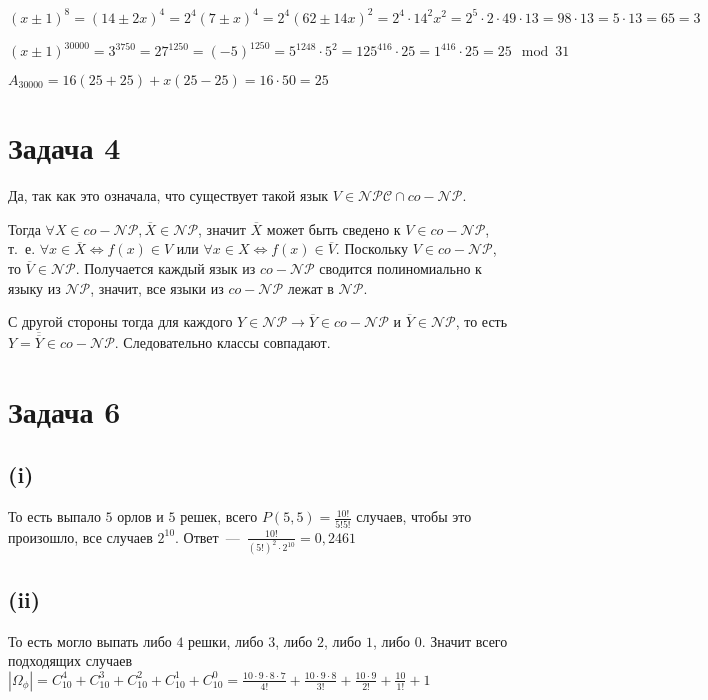 \documentclass[a4paper,12pt]{article} %
\begin{document}
$(x\pm1)^{8}=(14\pm2x)^4=2^4(7\pm x)^4=2^4(62\pm14x)^2=2^4\cdot 14^2 x^2=2^5\cdot 2\cdot 49\cdot 13=98\cdot 13=5\cdot 13=65=3$

$(x\pm1)^{30000}=3^{3750}=27^{1250}=(-5)^{1250}=5^{1248}\cdot 5^2=125^{416}\cdot 25=1^{416}\cdot 25=25\mod 31$

$A_{30000}=16(25+25)+x(25-25)=16\cdot 50=25$


\section{Задача 4}
\hspace{5mm}
Да, так как это означала, что существует такой язык $V\in\mathcal{NPC}\cap co-\mathcal{NP}$. 

Тогда $\forall X\in co-\mathcal{NP}, \overline{X}\in \mathcal{NP}$, значит $\overline{X}$ может быть сведено к $V\in co-\mathcal{NP}$, т.~е. $\forall x\in \overline{X}\Leftrightarrow f(x)\in V$ или $\forall x\in X\Leftrightarrow f(x)\in \overline{V}$. Поскольку $V\in co-\mathcal{NP}$, то $\overline{V}\in \mathcal{NP}$. Получается каждый язык из $co-\mathcal{NP}$ сводится полиномиально к языку из $\mathcal{NP}$, значит, все языки из $co-\mathcal{NP}$ лежат в $\mathcal{NP}$.

С другой стороны тогда для каждого $Y\in \mathcal{NP}\rightarrow\overline{Y}\in co-\mathcal{NP}$ и $\overline{Y}\in \mathcal{NP}$, то есть $Y=\overline{\overline{Y}}\in co-\mathcal{NP}$. Следовательно классы совпадают.


\section{Задача 6}
\subsection{(i)}
\hspace{5mm}
То есть выпало $5$ орлов и $5$ решек, всего $P(5,5)=\frac{10!}{5!5!}$ случаев, чтобы это произошло, все случаев $2^{10}$. Ответ~---~$\frac{10!}{(5!)^2\cdot 2^{10}}=0,2461$

\subsection{(ii)}
\hspace{5mm}
То есть могло выпать либо $4$ решки, либо $3$, либо $2$, либо $1$, либо $0$. Значит всего подходящих случаев $|\Omega_{\phi}|=C_{10}^4+C_{10}^3+C_{10}^2+C_{10}^1+C_{10}^0=\frac{10\cdot9\cdot8\cdot7}{4!}+\frac{10\cdot9\cdot8}{3!}+\frac{10\cdot9}{2!}+\frac{10}{1!}+1$
\end{document}
